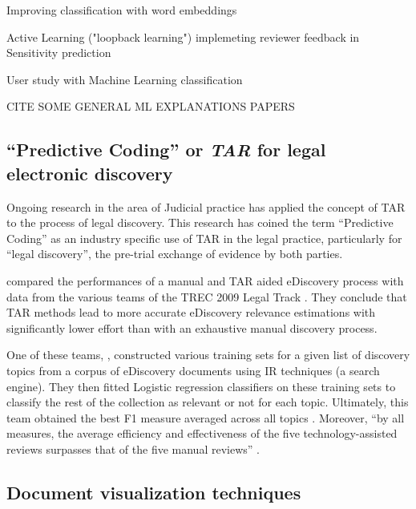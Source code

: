 \documentclass{l4proj}
\begin{document}
\autocite{jose_enhancing_2017} Improving classification with word embeddings

\autocite{pasi_active_2018} Active Learning ("loopback learning") implemeting reviewer feedback in Sensitivity prediction

\autocite{mcdonaldHowSensitivityClassification2019} User study with Machine Learning classification

CITE SOME GENERAL ML EXPLANATIONS PAPERS

\subsection{``Predictive Coding'' or \textit{TAR} for legal electronic discovery}

Ongoing research in the area of Judicial practice has applied the concept of TAR to the process of legal discovery.
This research has coined the term ``Predictive Coding'' \autocite{carrollGrossmancormackGlossaryTechnologyassisted2013} as an industry specific use of TAR in the legal practice, particularly for ``legal discovery'', the pre-trial exchange of evidence by both parties.

\textcite{grossmanTechnologyAssistedReviewEDiscovery2010} compared the performances of a manual and TAR aided eDiscovery process with data from the various teams of the TREC 2009 Legal Track \autocite{hedinOverviewTREC2009}.
They conclude that TAR methods lead to more accurate eDiscovery relevance estimations with significantly lower effort than with an exhaustive manual discovery process.


One of these teams, \textcite{cormackMachineLearningInformation2009}, constructed various training sets for a given list of discovery topics from a corpus of eDiscovery documents using IR techniques (a search engine).
They then fitted Logistic regression classifiers on these training sets to classify the rest of the collection as relevant or not for each topic.
Ultimately, this team obtained the best F1 measure averaged across all topics \autocite{hedinOverviewTREC2009}.
Moreover, ``by all measures, the average efficiency and effectiveness of the five technology-assisted reviews surpasses that of the five manual reviews'' \autocite[p.~43]{grossmanTechnologyAssistedReviewEDiscovery2010}.


\subsection{Document visualization techniques}
\end{document}
